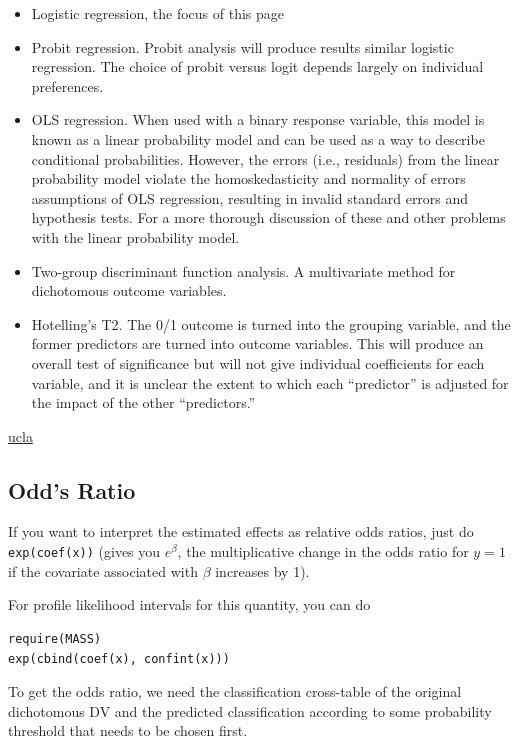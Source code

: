 \documentclass[
]{book}
\providecommand{\tightlist}{%
  \setlength{\itemsep}{0pt}\setlength{\parskip}{0pt}}
\begin{document}
\begin{itemize}
\tightlist
\item
  Logistic regression, the focus of this page
\item
  Probit regression. Probit analysis will produce results similar logistic regression. The choice of probit versus logit depends largely on individual preferences.
\item
  OLS regression. When used with a binary response variable, this model is known as a linear probability model and can be used as a way to describe conditional probabilities. However, the errors (i.e., residuals) from the linear probability model violate the homoskedasticity and normality of errors assumptions of OLS regression, resulting in invalid standard errors and hypothesis tests. For a more thorough discussion of these and other problems with the linear probability model.
\item
  Two-group discriminant function analysis. A multivariate method for dichotomous outcome variables.
\item
  Hotelling's T2. The 0/1 outcome is turned into the grouping variable, and the former predictors are turned into outcome variables. This will produce an overall test of significance but will not give individual coefficients for each variable, and it is unclear the extent to which each ``predictor'' is adjusted for the impact of the other ``predictors.''
\end{itemize}

\href{https://stats.idre.ucla.edu/r/dae/logit-regression/}{ucla}

\hypertarget{odds-ratio}{%
\subsection{Odd's Ratio}\label{odds-ratio}}

If you want to interpret the estimated effects as relative odds ratios,
just do \texttt{exp(coef(x))} (gives you \(e^β\),
the multiplicative change in the odds ratio for \(y=1\)
if the covariate associated with \(β\) increases by 1).

For profile likelihood intervals for this quantity, you can do

\begin{verbatim}
require(MASS)
exp(cbind(coef(x), confint(x)))  
\end{verbatim}

To get the odds ratio, we need the classification cross-table
of the original dichotomous DV and
the predicted classification according to some probability threshold that needs to be chosen first.
\end{document}
